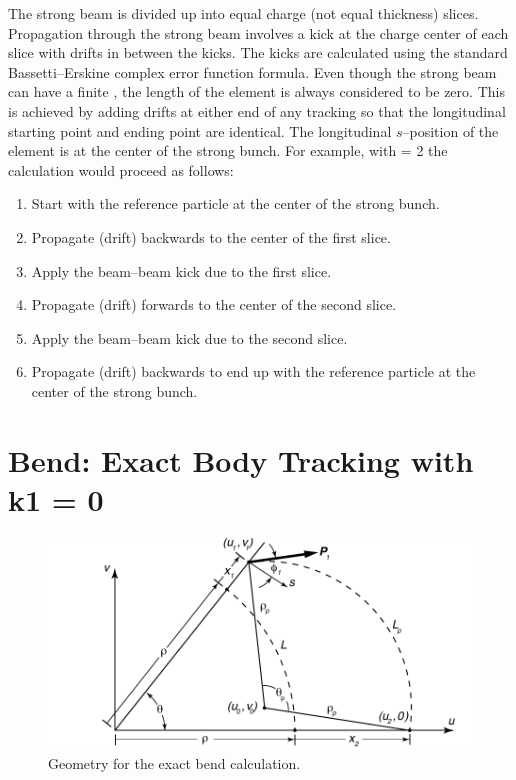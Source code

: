 The strong beam is divided up into  equal charge (not
equal thickness) slices. Propagation through the strong beam involves
a kick at the charge center of each slice with drifts in between the
kicks. The kicks are calculated using the standard Bassetti--Erskine
complex error function formula\cite{b:talman}.  Even though the strong
beam can have a finite , the length of the element is always
considered to be zero. This is achieved by adding drifts at either end
of any tracking so that the longitudinal starting point and ending
point are identical. The longitudinal $s$--position of the
 element is at the center of the strong bunch. For
example, with  = 2 the calculation would proceed as
follows:
\begin{enumerate}
  \item  Start with the reference particle at the center of the strong bunch.
  \item  Propagate (drift) backwards to the center of the first slice.
  \item  Apply the beam--beam kick due to the first slice.
  \item  Propagate (drift) forwards to the center of the second slice.
  \item  Apply the beam--beam kick due to the second slice.
  \item  Propagate (drift) backwards to end up with the reference particle
     at the center of the strong bunch.
\end{enumerate}

\section{Bend: Exact Body Tracking with k1 = 0}
\label{s:bend.body.std}

\begin{figure}[h]
  \centering
  \includegraphics[width=5in]{bend-exact.pdf}
  \caption{Geometry for the exact bend calculation.}
  \label{f:bend.exact}
\end{figure}


